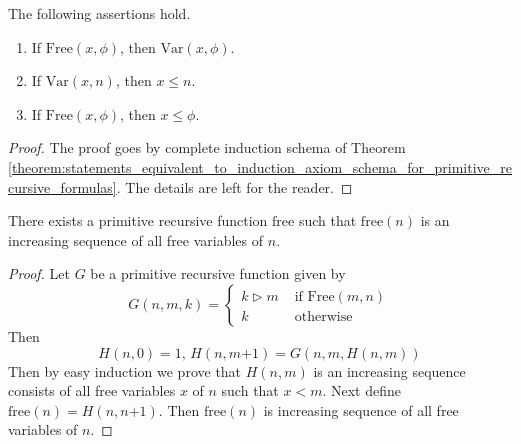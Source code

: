 \documentclass[10pt]{amsart}
\newcommand{\mle}{\boldsymbol{<}}
\newcommand{\mleq}{\boldsymbol{\leq}}
\newcommand{\meq}{\boldsymbol{=}}
\newcommand{\mplus}{\boldsymbol{+}}
\begin{document}
\begin{fact}\label{fact:if_variable_is_free_in_expression_then_it_is_smaller_than_it}
  The following assertions hold.
  \begin{enumerate}[label=\emph{\textbf{(\arabic*)}}, leftmargin=3.0em]
    \item If $\mathrm{Free}(x,\phi)$, then $\mathrm{Var}(x,\phi)$.
    \item If $\mathrm{Var}(x,n)$, then $x \mleq n$. 
    \item If $\mathrm{Free}(x,\phi)$, then $x \mleq \phi$. 
  \end{enumerate}
\end{fact}
\begin{proof}
  The proof goes by complete induction schema of Theorem \ref{theorem:statements_equivalent_to_induction_axiom_schema_for_primitive_recursive_formulas}. The details are left for the reader.
\end{proof}

\begin{proposition}\label{proposition:sequence_of_free_variables}
  There exists a primitive recursive function $\mathrm{free}$ such that $\mathrm{free}(n)$ is an increasing sequence of all free variables of $n$.
\end{proposition}
\begin{proof}
  Let $G$ be a primitive recursive function given by 
  $$G(n,m,k) \meq \begin{cases}
    k \triangleright m &\mbox{ if }\mathrm{Free}(m,n)\\
    k &\mbox{ otherwise }
  \end{cases}$$
  Then
  $$H(n,0) \meq 1,\,H(n,m\mplus1) \meq G(n,m,H(n,m))$$
  Then by easy induction we prove that $H(n,m)$ is an increasing sequence consists of all free variables $x$ of $n$ such that $x \mle m$. Next define $\mathrm{free}(n) \meq H(n,n \mplus 1)$. Then $\mathrm{free}(n)$ is increasing sequence of all free variables of $n$. 
\end{proof}
\end{document}
